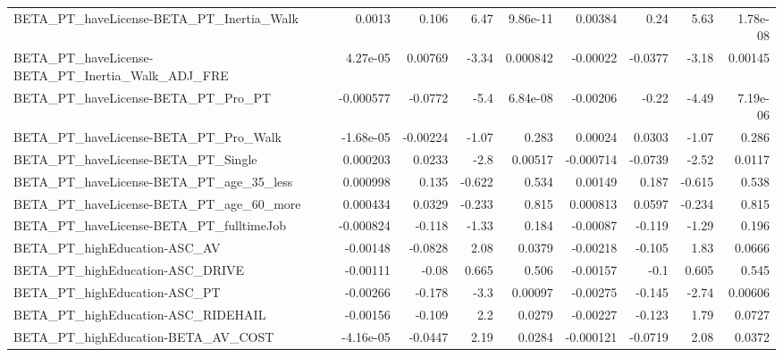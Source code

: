 \begin{tabular}{lrrrrrrrr}
BETA\_PT\_haveLicense-BETA\_PT\_Inertia\_Walk           &      0.0013 &        0.106 &     6.47 & 9.86e-11 &    0.00384 &        0.24 &         5.63 &      1.78e-08 \\
BETA\_PT\_haveLicense-BETA\_PT\_Inertia\_Walk\_ADJ\_FRE   &    4.27e-05 &      0.00769 &    -3.34 & 0.000842 &   -0.00022 &     -0.0377 &        -3.18 &       0.00145 \\
BETA\_PT\_haveLicense-BETA\_PT\_Pro\_PT                 &   -0.000577 &      -0.0772 &     -5.4 & 6.84e-08 &   -0.00206 &       -0.22 &        -4.49 &      7.19e-06 \\
BETA\_PT\_haveLicense-BETA\_PT\_Pro\_Walk               &   -1.68e-05 &     -0.00224 &    -1.07 &    0.283 &    0.00024 &      0.0303 &        -1.07 &         0.286 \\
BETA\_PT\_haveLicense-BETA\_PT\_Single                 &    0.000203 &       0.0233 &     -2.8 &  0.00517 &  -0.000714 &     -0.0739 &        -2.52 &        0.0117 \\
BETA\_PT\_haveLicense-BETA\_PT\_age\_35\_less            &    0.000998 &        0.135 &   -0.622 &    0.534 &    0.00149 &       0.187 &       -0.615 &         0.538 \\
BETA\_PT\_haveLicense-BETA\_PT\_age\_60\_more            &    0.000434 &       0.0329 &   -0.233 &    0.815 &   0.000813 &      0.0597 &       -0.234 &         0.815 \\
BETA\_PT\_haveLicense-BETA\_PT\_fulltimeJob            &   -0.000824 &       -0.118 &    -1.33 &    0.184 &   -0.00087 &      -0.119 &        -1.29 &         0.196 \\
BETA\_PT\_highEducation-ASC\_AV                       &    -0.00148 &      -0.0828 &     2.08 &   0.0379 &   -0.00218 &      -0.105 &         1.83 &        0.0666 \\
BETA\_PT\_highEducation-ASC\_DRIVE                    &    -0.00111 &        -0.08 &    0.665 &    0.506 &   -0.00157 &        -0.1 &        0.605 &         0.545 \\
BETA\_PT\_highEducation-ASC\_PT                       &    -0.00266 &       -0.178 &     -3.3 &  0.00097 &   -0.00275 &      -0.145 &        -2.74 &       0.00606 \\
BETA\_PT\_highEducation-ASC\_RIDEHAIL                 &    -0.00156 &       -0.109 &      2.2 &   0.0279 &   -0.00227 &      -0.123 &         1.79 &        0.0727 \\
BETA\_PT\_highEducation-BETA\_AV\_COST                 &   -4.16e-05 &      -0.0447 &     2.19 &   0.0284 &  -0.000121 &     -0.0719 &         2.08 &        0.0372 \\

\end{tabular}
